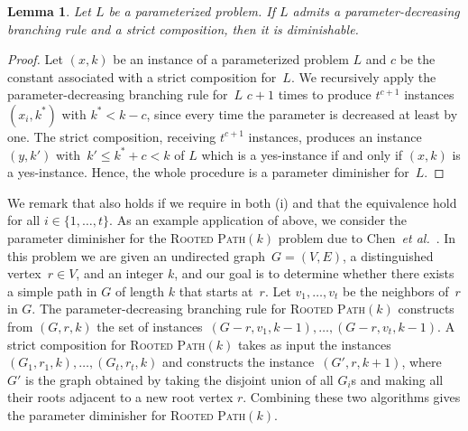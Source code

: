 \documentclass[11pt,a4,USenglish]{article}
\newcommand{\prob}[1]{\textsc{#1}}
\newcommand{\pprob}[2]{\prob{#1}$(#2)$}
\theoremstyle{definition}
\theoremstyle{plain}
\newtheorem{lem}{Lemma}
\theoremstyle{remark}
\begin{document}
\begin{lem}%
\label{lem:branchcomp}%
Let $L$ be a parameterized problem. If $L$ admits a parameter-decreasing branching rule and a strict composition, then it is diminishable.
\end{lem}
%
{
\begin{proof}
Let $(x, k)$ be an instance of a parameterized problem $L$ and $c$ be the constant associated with a strict composition for~$L$. 
We recursively apply the parameter-decreasing branching rule for~$L$ $c+1$ times to produce $t^{c+1}$ instances $(x_i,k^*)$ with $k^* < k-c$, since every time the parameter is decreased at least by one. 
The strict composition, receiving $t^{c+1}$ instances, produces an instance~$(y, k')$ with~$k'\leq k^*+c<k$ of $L$ which is a yes-instance if and only if $(x, k)$ is a yes-instance. 
Hence, the whole procedure is a parameter diminisher for~$L$.
\end{proof}
}
We remark that  also holds if we require in both (i) and  that the equivalence hold for all $i \in \{1,\ldots,t\}$.
As an example application of  above, we consider the parameter diminisher for the \pprob{Rooted Path}{k} problem due to Chen~\emph{et al.}~\cite{chen2011lower}. 
In this problem we are given an undirected graph~$G=(V,E)$, a distinguished vertex~$r \in V$, and an integer $k$, and our goal is to determine whether there exists a simple path in $G$ of length $k$ that starts at~$r$. 
Let $v_1,\ldots,v_t$ be the neighbors of~$r$ in $G$. 
The parameter-decreasing branching rule for \pprob{Rooted Path}{k} constructs from $(G,r,k)$ the set of instances~$(G-r,v_1,k-1),\ldots,(G-r,v_t,k-1)$. 
A strict composition for \pprob{Rooted Path}{k} takes as input the instances $(G_1,r_1,k),\ldots,(G_t,r_t,k)$ and constructs the instance~$(G',r,k+1)$, where~$G'$ is the graph obtained by taking the disjoint union of all $G_i$s and making all their roots adjacent to a new root vertex $r$. 
Combining these two algorithms gives the parameter diminisher for \pprob{Rooted Path}{k}.%


%
%
%
%
%
%


%
%
%
%
%
%
%
%
%
%
%
%
%
\end{document}
